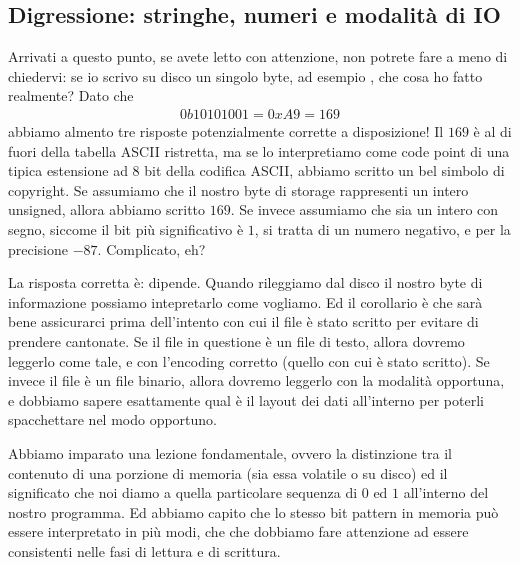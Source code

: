 \subsection{Digressione: stringhe, numeri e modalit\`a di IO}

Arrivati a questo punto, se avete letto con attenzione, non potrete fare a meno di
chiedervi: se io scrivo su disco un singolo byte, ad esempio ,
che cosa ho fatto realmente? Dato che
\begin{align*}
  0b10101001 = 0xA9 = 169
\end{align*}
abbiamo almento tre risposte potenzialmente corrette a disposizione! Il $169$ \`e
al di fuori della tabella ASCII ristretta, ma se lo interpretiamo come code point
di una tipica estensione ad $8$ bit della codifica ASCII, abbiamo scritto un bel
simbolo di copyright. Se assumiamo che il nostro byte di storage rappresenti un
intero unsigned, allora abbiamo scritto $169$. Se invece assumiamo che sia un intero
con segno, siccome il bit pi\`u significativo \`e $1$, si tratta di un numero negativo,
e per la precisione $-87$. Complicato, eh?

La risposta corretta \`e: dipende. Quando rileggiamo dal disco il nostro byte di
informazione possiamo intepretarlo come vogliamo. Ed il corollario \`e che sar\`a
bene assicurarci prima dell'intento con cui il file \`e stato scritto per evitare
di prendere cantonate. Se il file in questione \`e un file di testo, allora dovremo
leggerlo come tale, e con l'encoding corretto (quello con cui \`e stato scritto).
Se invece il file \`e un file binario, allora dovremo leggerlo con la modalit\`a
opportuna, e dobbiamo sapere esattamente qual \`e il layout dei dati all'interno
per poterli spacchettare nel modo opportuno.


Abbiamo imparato una lezione fondamentale, ovvero la distinzione tra il contenuto
di una porzione di memoria (sia essa volatile o su disco) ed il significato che
noi diamo a quella particolare sequenza di $0$ ed $1$ all'interno del nostro programma.
Ed abbiamo capito che lo stesso bit pattern in memoria pu\`o essere interpretato
in pi\`u modi, che che dobbiamo fare attenzione ad essere consistenti nelle fasi di
lettura e di scrittura.

